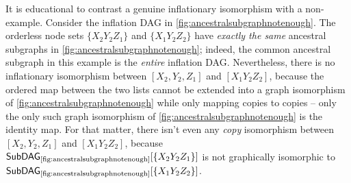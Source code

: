 It is educational to contrast a genuine inflationary isomorphism with a non-example. Consider the inflation DAG in \cref{fig:ancestralsubgraphnotenough}. The orderless node sets $\{X_2 Y_2 Z_1\}$ and $\{X_1 Y_2 Z_2\}$ have \emph{exactly the same} ancestral subgraphs in \cref{fig:ancestralsubgraphnotenough}; indeed, the common ancestral subgraph in this example is the \emph{entire} inflation DAG. 
Nevertheless, there is no inflationary isomorphism between $\left[X_2, Y_2, Z_1\right]$ and $\left[X_1 Y_2 Z_2\right]$, because the ordered map between the two lists cannot be extended into a graph isomorphism of \cref{fig:ancestralsubgraphnotenough} while only mapping copies to copies -- only the only such graph isomorphism of \cref{fig:ancestralsubgraphnotenough} is the identity map. For that matter, there isn't even any \emph{copy} isomorphism between  $\left[X_2, Y_2, Z_1\right]$ and $\left[X_1 Y_2 Z_2\right]$, because $\subgraph[\text{\cref{fig:ancestralsubgraphnotenough}}]{\{X_2 Y_2 Z_1\}}$ is not graphically isomorphic to $\subgraph[\text{\cref{fig:ancestralsubgraphnotenough}}]{\{X_1 Y_2 Z_2\}}$.


